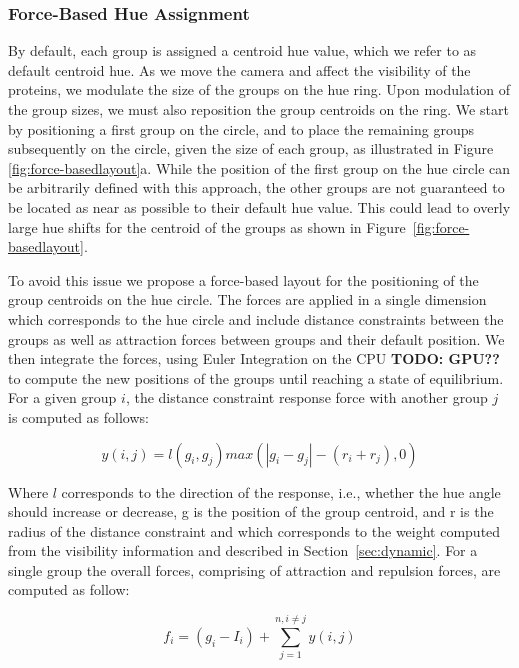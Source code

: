 \documentclass{egpubl}
\begin{document}
	\subsubsection{Force-Based Hue Assignment}
	
	By default, each group is assigned a centroid hue value, which we refer to as default centroid hue.
	As we move the camera and affect the visibility of the proteins, we modulate the size of the groups on the hue ring.
	Upon modulation of the group sizes, we must also reposition the group centroids on the ring.
	We start by positioning a first group on the circle, and to place the remaining groups subsequently on the circle, given the size of each group, as illustrated in Figure \ref{fig:force-basedlayout}a.
	While the position of the first group on the hue circle can be arbitrarily defined with this approach, the other groups are not guaranteed to be located as near as possible to their default hue value.
	This could lead to overly large hue shifts for the centroid of the groups as shown in Figure~\ref{fig:force-basedlayout}.
	
	To avoid this issue we propose a force-based layout for the positioning of the group centroids on the hue circle.
	The forces are applied in a single dimension which corresponds to the hue circle and include distance constraints between the groups as well as attraction forces between groups and their default position.
	We then integrate the forces, using Euler Integration on the CPU \textbf{TODO: GPU??} to compute the new positions of the groups until reaching a state of equilibrium.
	For a given group $i$, the distance constraint response force with another group $j$ is computed as follows:
	
	\begin{equation}
	y(i, j) = l(g_{i},g_{j})max(|g_{i} - g_{j}| - (r_{i}+r_{j}), 0)
	\end{equation}
	
	Where $l$ corresponds to the direction of the response, i.e., whether the hue angle should increase or decrease, g is the position of the group centroid, and r is the radius of the distance constraint and which corresponds to the weight computed from the visibility information and described in Section~\ref{sec:dynamic}.
	For a single group the overall forces, comprising of attraction and repulsion forces, are computed as follow:
	
	\begin{equation}
	f_{i} = (g_{i} - I_{i}) + \sum_{j=1}^{n, i \neq j} y(i,j)
	\end{equation}
	
\end{document}
